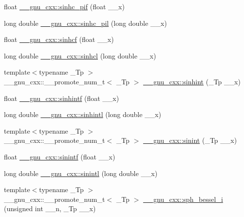 \begin{DoxyCompactItemize}
\item 
float \hyperlink{group__gnu__math__spec__func_ga26e54504db6541550266140f5264acbe}{\+\_\+\+\_\+gnu\+\_\+cxx\+::sinhc\+\_\+pif} (float \+\_\+\+\_\+x)
\item 
long double \hyperlink{group__gnu__math__spec__func_gaa572bf7633f457c86cef65bfd6ec4ad9}{\+\_\+\+\_\+gnu\+\_\+cxx\+::sinhc\+\_\+pil} (long double \+\_\+\+\_\+x)
\item 
float \hyperlink{group__gnu__math__spec__func_gadaa7ea78625cc2eeb70213a50719813d}{\+\_\+\+\_\+gnu\+\_\+cxx\+::sinhcf} (float \+\_\+\+\_\+x)
\item 
long double \hyperlink{group__gnu__math__spec__func_ga7467a001bb18ef8bff0a7e9927bab356}{\+\_\+\+\_\+gnu\+\_\+cxx\+::sinhcl} (long double \+\_\+\+\_\+x)
\item 
{\footnotesize template$<$typename \+\_\+\+Tp $>$ }\\\+\_\+\+\_\+gnu\+\_\+cxx\+::\+\_\+\+\_\+promote\+\_\+num\+\_\+t$<$ \+\_\+\+Tp $>$ \hyperlink{group__gnu__math__spec__func_ga19941fbce9fb8e097eb757761f9326db}{\+\_\+\+\_\+gnu\+\_\+cxx\+::sinhint} (\+\_\+\+Tp \+\_\+\+\_\+x)
\item 
float \hyperlink{group__gnu__math__spec__func_ga375ca3ceb1eafd678e298d0aea4bb3e6}{\+\_\+\+\_\+gnu\+\_\+cxx\+::sinhintf} (float \+\_\+\+\_\+x)
\item 
long double \hyperlink{group__gnu__math__spec__func_ga8b7f1a070be7233a3179e3cbded387ee}{\+\_\+\+\_\+gnu\+\_\+cxx\+::sinhintl} (long double \+\_\+\+\_\+x)
\item 
{\footnotesize template$<$typename \+\_\+\+Tp $>$ }\\\+\_\+\+\_\+gnu\+\_\+cxx\+::\+\_\+\+\_\+promote\+\_\+num\+\_\+t$<$ \+\_\+\+Tp $>$ \hyperlink{group__gnu__math__spec__func_ga4b0807985bd194392fc7d7abe4cf2c61}{\+\_\+\+\_\+gnu\+\_\+cxx\+::sinint} (\+\_\+\+Tp \+\_\+\+\_\+x)
\item 
float \hyperlink{group__gnu__math__spec__func_ga8b63406fec50d7e00470521b82fb32a2}{\+\_\+\+\_\+gnu\+\_\+cxx\+::sinintf} (float \+\_\+\+\_\+x)
\item 
long double \hyperlink{group__gnu__math__spec__func_ga3ff83e5c5f1435064b6942ca8b7c8779}{\+\_\+\+\_\+gnu\+\_\+cxx\+::sinintl} (long double \+\_\+\+\_\+x)
\item 
{\footnotesize template$<$typename \+\_\+\+Tp $>$ }\\\+\_\+\+\_\+gnu\+\_\+cxx\+::\+\_\+\+\_\+promote\+\_\+num\+\_\+t$<$ \+\_\+\+Tp $>$ \hyperlink{group__gnu__math__spec__func_ga93454a071a189f7cc9e79078526aa3fd}{\+\_\+\+\_\+gnu\+\_\+cxx\+::sph\+\_\+bessel\+\_\+i} (unsigned int \+\_\+\+\_\+n, \+\_\+\+Tp \+\_\+\+\_\+x)

\end{DoxyCompactItemize}
